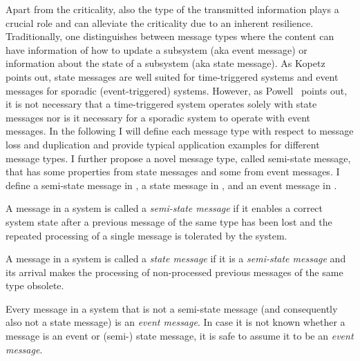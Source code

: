 Apart from the criticality, also the type of the transmitted information plays a crucial role and can alleviate the criticality due to an inherent resilience.
Traditionally, one distinguishes between message types where the content can have information of how to update a subsystem (aka event message) or information about the state of a subsystem (aka state message).
As Kopetz~\cite{kopetz2011d} points out, state messages are well suited for time-triggered systems and event messages for sporadic (event-triggered) systems.
However, as Powell~\cite{powell2002} points out, it is not necessary that a time-triggered system operates solely with state messages nor is it necessary for a sporadic system to operate with event messages.
In the following I will define each message type with respect to message loss and duplication and provide typical application examples for different message types.
I further propose a novel message type, called semi-state message, that has some properties from state messages and some from event messages.
I define a semi-state message in \Def{\ref{def_semi_state_msg}}, a state message in \Def{\ref{def_state_msg}}, and an event message in \Def{\ref{def_event_msg}}.

\begin{definition}
\label{def_semi_state_msg}
A message in a system is called a {\em semi-state message} if it enables a correct system state after a previous message of the same type has been lost and the repeated processing of a single message is tolerated by the system.
\end{definition}

\begin{definition}
\label{def_state_msg}
A message in a system is called a {\em state message} if it is a {\em semi-state message} and its arrival makes the processing of non-processed previous messages of the same type obsolete.
\end{definition}

\begin{definition}
\label{def_event_msg}
Every message in a system that is not a semi-state message (and consequently also not a state message) is an {\em event message}.
In case it is not known whether a message is an event or (semi-) state message, it is safe to assume it to be an {\em event message}.
\end{definition}

